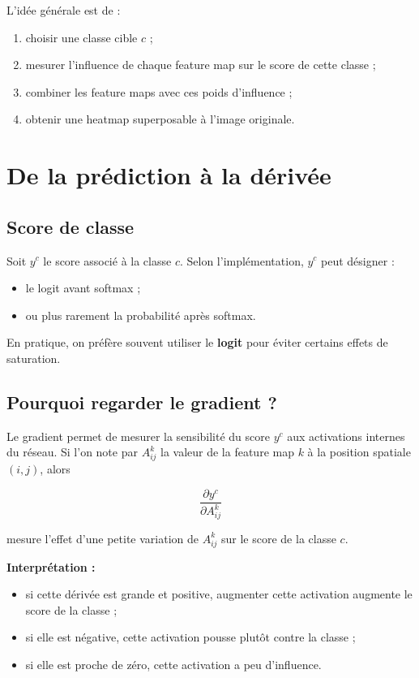 ﻿\documentclass[11pt,a4paper]{article}
\begin{document}
L'idée générale est de :
\begin{enumerate}[label=\arabic*)]
    \item choisir une classe cible $c$ ;
    \item mesurer l'influence de chaque feature map sur le score de cette classe ;
    \item combiner les feature maps avec ces poids d'influence ;
    \item obtenir une heatmap superposable à l'image originale.
\end{enumerate}

\section{De la prédiction à la dérivée}

\subsection{Score de classe}

Soit $y^c$ le score associé à la classe $c$. Selon l'implémentation, $y^c$ peut désigner :
\begin{itemize}
    \item le logit avant softmax ;
    \item ou plus rarement la probabilité après softmax.
\end{itemize}

En pratique, on préfère souvent utiliser le \textbf{logit} pour éviter certains effets de saturation.

\subsection{Pourquoi regarder le gradient ?}

Le gradient permet de mesurer la sensibilité du score $y^c$ aux activations internes du réseau. Si l'on note par $A_{ij}^k$ la valeur de la feature map $k$ à la position spatiale $(i,j)$, alors

\[
\frac{\partial y^c}{\partial A_{ij}^k}
\]

mesure l'effet d'une petite variation de $A_{ij}^k$ sur le score de la classe $c$.

\textbf{Interprétation :}
\begin{itemize}
    \item si cette dérivée est grande et positive, augmenter cette activation augmente le score de la classe ;
    \item si elle est négative, cette activation pousse plutôt contre la classe ;
    \item si elle est proche de zéro, cette activation a peu d'influence.
\end{itemize}
\end{document}
